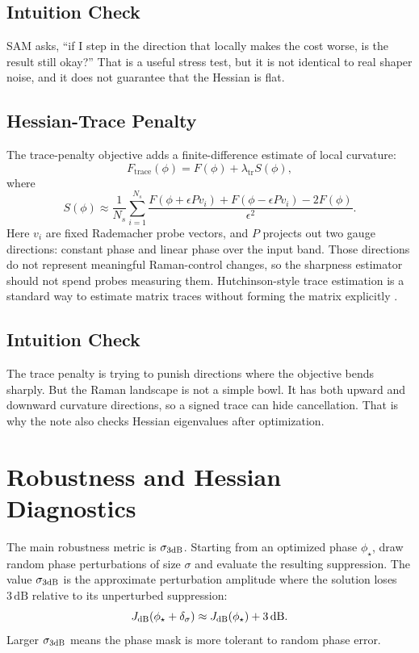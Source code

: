 \documentclass[11pt]{article}
\begin{document}
\subsection*{Intuition Check}

SAM asks, ``if I step in the direction that locally makes the cost worse, is
the result still okay?'' That is a useful stress test, but it is not identical
to real shaper noise, and it does not guarantee that the Hessian is flat.

\subsection{Hessian-Trace Penalty}

The trace-penalty objective adds a finite-difference estimate of local
curvature:
\[
    F_{\mathrm{trace}}(\phi)
    =
    F(\phi) + \lambda_{\mathrm{tr}} S(\phi),
\]
where
\[
    S(\phi)
    \approx
    \frac{1}{N_s}
    \sum_{i=1}^{N_s}
    \frac{
    F(\phi+\epsilon Pv_i)
    +F(\phi-\epsilon Pv_i)
    -2F(\phi)
    }{\epsilon^2}.
\]
Here \(v_i\) are fixed Rademacher probe vectors, and \(P\) projects out two
gauge directions: constant phase and linear phase over the input band. Those
directions do not represent meaningful Raman-control changes, so the sharpness
estimator should not spend probes measuring them. Hutchinson-style trace
estimation is a standard way to estimate matrix traces without forming the
matrix explicitly \cite{hutchinson1989,meyer2021}.

\subsection*{Intuition Check}

The trace penalty is trying to punish directions where the objective bends
sharply. But the Raman landscape is not a simple bowl. It has both upward and
downward curvature directions, so a signed trace can hide cancellation. That
is why the note also checks Hessian eigenvalues after optimization.

\section{Robustness and Hessian Diagnostics}

The main robustness metric is \(\sigma_{3\mathrm{dB}}\). Starting from an optimized
phase \(\phi_\star\), draw random phase perturbations of size \(\sigma\) and
evaluate the resulting suppression. The value \(\sigma_{3\mathrm{dB}}\) is the
approximate perturbation amplitude where the solution loses
\(3\,\mathrm{dB}\) relative to its unperturbed suppression:
\[
    J_{\mathrm{dB}}(\phi_\star+\delta_\sigma)
    \approx
    J_{\mathrm{dB}}(\phi_\star)+3\,\mathrm{dB}.
\]
Larger \(\sigma_{3\mathrm{dB}}\) means the phase mask is more tolerant to random phase
error.
\end{document}
